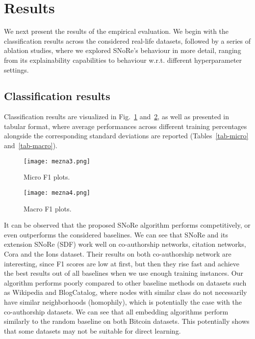 \documentclass[twoside,11pt]{article}
\begin{document}
\section{Results}
\label{sec:results}
We next present the results of the empirical evaluation. We begin with the classification results across the considered real-life datasets, followed by a series of ablation studies, where we explored SNoRe's behaviour in more detail, ranging from its explainability capabilities to behaviour w.r.t. different hyperparameter settings.

\subsection{Classification results}
\label{sec:classification}
Classification results are visualized in Fig.~\ref{fig:micro} and~\ref{fig:macro}, as well as presented in tabular format, where average performances across different training percentages alongside the corresponding standard deviations are reported (Tables~\ref{tab-micro} and~\ref{tab-macro}).

\begin{figure}[t!]
  \centering
  \texttt{[image: mezna3.png]}
  \caption{Micro F1 plots.}
  \label{fig:micro}
\end{figure}

\begin{figure}[t!]
  \centering
  \texttt{[image: mezna4.png]}
  \caption{Macro F1 plots.}
  \label{fig:macro}
\end{figure}

It can be observed that the proposed SNoRe algorithm performs competitively, or even outperforms the considered baselines. We can see that SNoRe and its extension SNoRe (SDF) work well on co-authorship networks, citation networks, Cora and the Ions dataset. Their results on both co-authorship network are interesting, since F1 scores are low at first, but then they rise fast and achieve the best results out of all baselines when we use enough training instances. Our algorithm performs poorly compared to other baseline methods on datasets such as Wikipedia and BlogCatalog, where nodes with similar class do not necessarily have similar neighborhoods (homophily), which is potentially the case with the co-authorship datasets. We can see that all embedding algorithms perform similarly to the random baseline on both Bitcoin datasets. This potentially shows that some datasets may not be suitable for direct learning.
\end{document}
